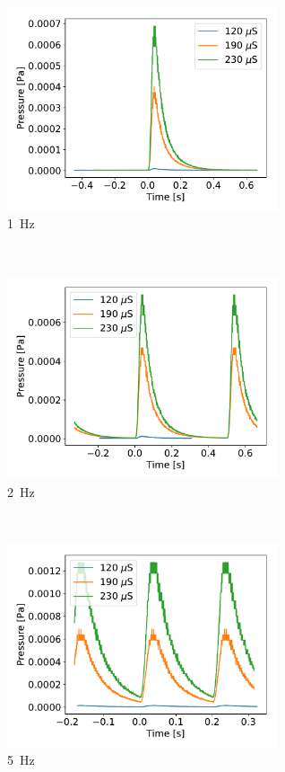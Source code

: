 \documentclass[a4paper,10pt]{article}
\begin{document}
\begin{figure}[htp!]
  \centering{}
  \begin{subfigure}[t]{0.45 \textwidth}
    \centering
    \includegraphics[height=6cm]{part1_1_hertz.pdf}
    \caption{\SI{1}{\hertz}}
  \end{subfigure}
  ~
  \begin{subfigure}[t]{0.45 \textwidth}
    \centering
    \includegraphics[height=6cm]{part1_2_hertz.pdf}
    \caption{\SI{2}{\hertz}}
  \end{subfigure}
  ~
  \begin{subfigure}[t]{0.45 \textwidth}
    \centering
    \includegraphics[height=6cm]{part1_5_hertz.pdf}
    \caption{\SI{5}{\hertz}}
  \end{subfigure}
  ~
  \begin{subfigure}[t]{0.45 \textwidth}

\end{subfigure}
\end{figure}
\end{document}
